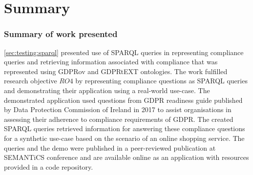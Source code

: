 
\section*{Summary}\label{sec:testing:conclusion}

\subsubsection*{Summary of work presented}
\autoref{sec:testing:sparql} presented use of SPARQL queries in representing compliance queries and retrieving information associated with compliance that was represented using GDPRov and GDPRtEXT ontologies.
The work fulfilled research objective $RO4$ by representing compliance questions as SPARQL queries and demonstrating their application using a real-world use-case.
The demonstrated application used questions from GDPR readiness guide published by Data Protection Commission of Ireland in 2017 to assist organisations in assessing their adherence to compliance requirements of GDPR.
The created SPARQL queries retrieved information for answering these compliance questions for a synthetic use-case based on the scenario of an online shopping service.
The queries and the demo were published in a peer-reviewed publication \cite{pandit_queryable_2018} at SEMANTiCS conference and are available online as an application with resources provided in a code repository.

